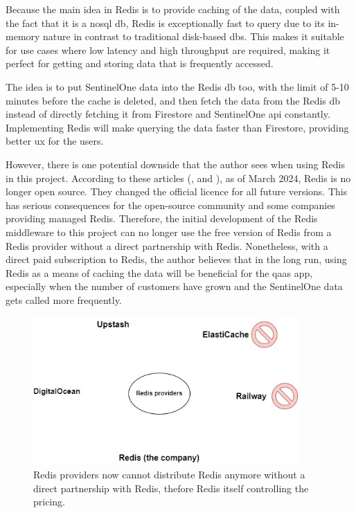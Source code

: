 \begin{multicols}{2}
  Because the main idea in Redis is to provide caching of the data, coupled with the fact that it is a \acrshort{nosql} \acrshort{db},
  Redis is exceptionally fast to query due to its in-memory nature in contrast to traditional disk-based \acrshort{db}s. This makes it
  suitable for use cases where low latency and high throughput are required, making it perfect for getting and storing data that is
  frequently accessed.

  The idea is to put SentinelOne data into the Redis \acrshort{db} too, with the limit of 5-10 minutes before the cache is deleted,
  and then fetch the data from the Redis \acrshort{db} instead of directly fetching it from Firestore and SentinelOne \acrshort{api}
  constantly. Implementing Redis will make querying the data faster than Firestore, providing better \acrshort{ux} for the users.

  However, there is one potential downside that the author sees when using Redis in this project. According to these articles
  (\textit{\cite{redisIsNoLongerFree}}, and \textit{\cite{redisMomento}}), as of March 2024, Redis is no  longer open source. They
  changed the official licence for all future versions. This has serious consequences for the open-source community and some companies
  providing managed Redis. Therefore, the initial development of the Redis middleware to this project can no longer use the free version
  of Redis from a Redis provider without a direct partnership with Redis. Nonetheless, with a direct paid subscription to Redis, the
  author believes that in the long run, using Redis as a means of caching the data will be beneficial for the \acrshort{qaas} app,
  especially when the number of customers have grown and the SentinelOne data gets called more frequently.
\end{multicols}


\begin{figure}[htbp]
  \centering
  \includegraphics[width=0.9\textwidth]{Figures/Redis Providers.jpg}
  \caption{Redis providers now cannot distribute Redis anymore without a direct partnership with Redis, thefore Redis itself controlling
    the pricing.}
\end{figure}


